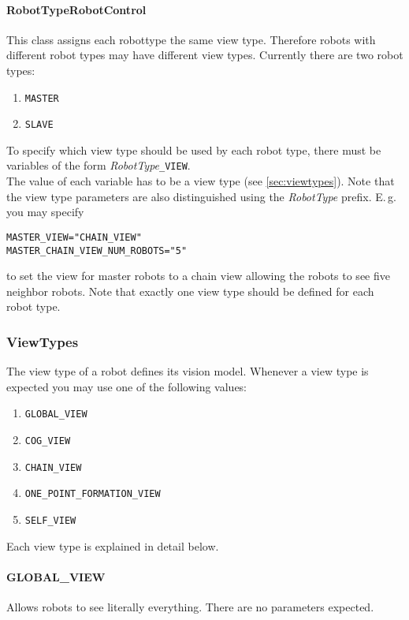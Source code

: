 \paragraph{RobotTypeRobotControl}\label{sec:robotTypeRobotControl} This class assigns each robottype the same view type. Therefore robots with different robot types may have different view types. Currently there are two robot types:
\begin{enumerate}
	\item \texttt{MASTER}
	\item \texttt{SLAVE}
\end{enumerate}
To specify which view type should be used by each robot type, there must be variables of the form \textit{RobotType}\texttt{\_VIEW}. \\
The value of each variable has to be a view type (see \ref{sec:viewtypes}). Note that the view type parameters are also distinguished using the \textit{RobotType} prefix. E.\,g. you may specify 
\begin{center}
\texttt{MASTER\_VIEW="CHAIN\_VIEW"} \\
\texttt{MASTER\_CHAIN\_VIEW\_NUM\_ROBOTS="5"}
\end{center} to set the view for master robots to a chain view allowing the robots to see five neighbor robots. Note that exactly one view type should be defined for each robot type.

\subsubsection{ViewTypes}\label{sec:viewtypes}
The view type of a robot defines its vision model. Whenever a view type is expected you may use one of the following values:
\begin{enumerate}
	\item \texttt{GLOBAL\_VIEW}
	\item \texttt{COG\_VIEW}
	\item \texttt{CHAIN\_VIEW}
	\item \texttt{ONE\_POINT\_FORMATION\_VIEW}
	\item \texttt{SELF\_VIEW}
\end{enumerate}
Each view type is explained in detail below.

\paragraph{GLOBAL\_VIEW} Allows robots to see literally everything. There are no parameters expected.

